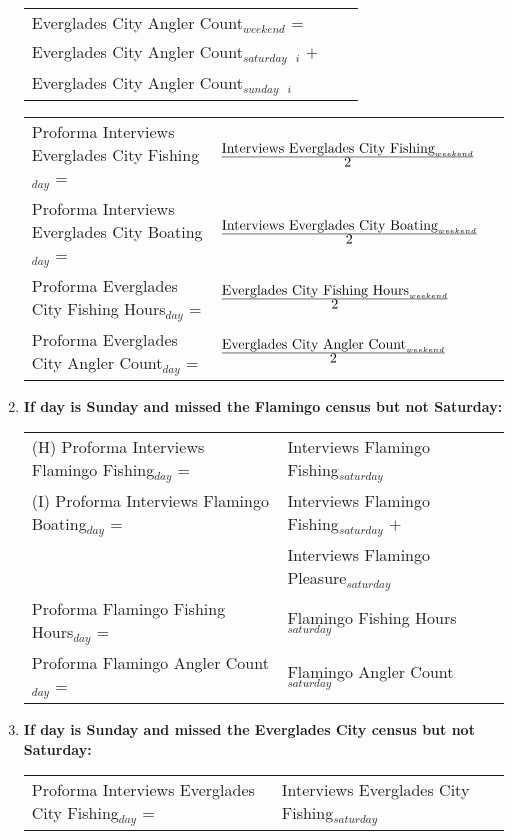 \documentclass[letterpaper,12pt]{article}
\newcommand{\hspacer}{\hspace*{1cm}}
\newcommand{\fraction}[1]{\textrm{\normalsize{#1}}}
\begin{document}
\begin{enumerate}
\begin{tabular}{l@{ }l@{ }l}
\hspacer \hspacer Everglades City Angler Count$_{weekend}$ = \\
\hspacer \hspacer \hspacer Everglades City Angler Count$_{saturday}$\ $_{i}$ $+$ \\
\hspacer \hspacer \hspacer Everglades City Angler Count$_{sunday}$\ $_{i}$ \\
\end{tabular}

\begin{tabular}{l@{ }l@{ }l}
	Proforma Interviews Everglades City Fishing$_{day}$ =
		& $
\frac
	{\fraction{Interviews Everglades City Fishing}_{weekend}}
      	{\fraction{2}}
		$ \\
	Proforma Interviews Everglades City Boating$_{day}$ =
		& $
\frac
	{\fraction{Interviews Everglades City Boating}_{weekend}}
      	{\fraction{2}}
		$ \\
	Proforma Everglades City Fishing Hours$_{day}$ =
		& $
\frac
	{\fraction{Everglades City Fishing Hours}_{weekend}}
      	{\fraction{2}}
		$ \\
	Proforma Everglades City Angler Count$_{day}$ =
		& $
\frac
	{\fraction{Everglades City Angler Count}_{weekend}}
      	{\fraction{2}}
		$ \\
\end{tabular}

\item
\textbf{If day is Sunday and missed the Flamingo census but not Saturday:} \\
\begin{tabular}{l@{ }l@{ }l}
	(H) Proforma Interviews Flamingo Fishing$_{day}$ =
		& Interviews Flamingo Fishing$_{saturday}$ \\

	(I) Proforma Interviews Flamingo Boating$_{day}$ =
		& Interviews Flamingo Fishing$_{saturday}$ $+$ \\
		& Interviews Flamingo Pleasure$_{saturday}$ \\

	Proforma Flamingo Fishing Hours$_{day}$ =
		& Flamingo Fishing Hours$_{saturday}$ \\

	Proforma Flamingo Angler Count$_{day}$ =
		& Flamingo Angler Count$_{saturday}$ \\
\end{tabular}

\item
\textbf{If day is Sunday and missed the Everglades City census but not Saturday:} \\
\begin{tabular}{l@{ }l@{ }l}
	Proforma Interviews Everglades City Fishing$_{day}$ =
		& Interviews Everglades City Fishing$_{saturday}$ \\


\end{tabular}
\end{enumerate}
\end{document}
